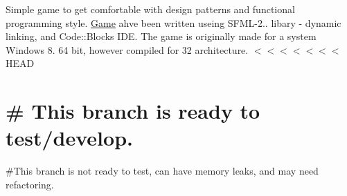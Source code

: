 Simple game to get comfortable with design patterns and functional programming style. \hyperlink{class_game}{Game} ahve been written useing S\+F\+M\+L-\/2.. libary -\/ dynamic linking, and Code\+::\+Blocks I\+D\+E. The game is originally made for a system Windows 8. 64 bit, however compiled for 32 architecture. $<$$<$$<$$<$$<$$<$$<$ H\+E\+A\+D \section*{\# This branch is ready to test/develop. }

\#\+This branch is not ready to test, can have memory leaks, and may need refactoring. 